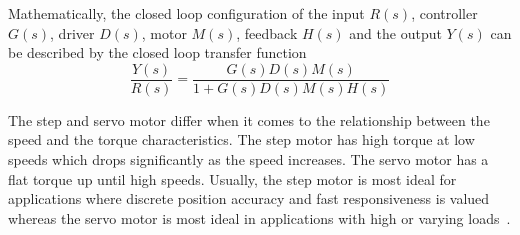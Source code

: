 Mathematically, the closed loop configuration of the input $R(s)$, controller $G(s)$, driver $D(s)$, motor $M(s)$, feedback $H(s)$ and the output $Y(s)$ can be described by the closed loop transfer function
\begin{equation}
    \frac{Y(s)}{R(s)} = \frac{G(s)D(s)M(s)}{1+G(s)D(s)M(s)H(s)}
\end{equation}

The step and servo motor differ when it comes to the relationship between the speed and the torque characteristics. The step motor has high torque at low speeds which drops significantly as the speed increases. The servo motor has a flat torque up until high speeds. Usually, the step motor is most ideal for applications where discrete position accuracy and fast responsiveness is valued whereas the servo motor is most ideal in applications with high or varying loads~\cite{servo_step}.